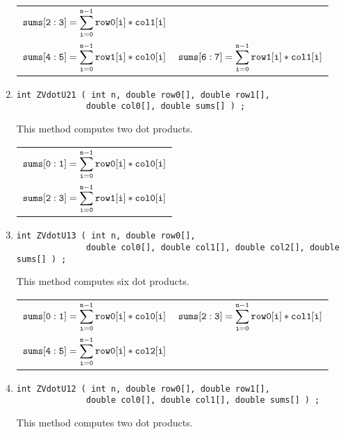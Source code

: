\begin{enumerate}
\begin{tabular}{ll}
$\displaystyle{\tt sums[2:3]}
               = \sum_{\tt i = 0}^{\tt n-1} {\tt row0[i] * col1[i]}$ \\
$\displaystyle{\tt sums[4:5]}
               = \sum_{\tt i = 0}^{\tt n-1} {\tt row1[i] * col0[i]}$ &
$\displaystyle{\tt sums[6:7]}
               = \sum_{\tt i = 0}^{\tt n-1} {\tt row1[i] * col1[i]}$ 
\end{tabular}
\item
\begin{verbatim}
int ZVdotU21 ( int n, double row0[], double row1[], 
              double col0[], double sums[] ) ;
\end{verbatim}
This method computes two dot products.
\par
\begin{tabular}{l}
$\displaystyle{\tt sums[0:1]}
               = \sum_{\tt i = 0}^{\tt n-1} {\tt row0[i] * col0[i]}$ \\
$\displaystyle{\tt sums[2:3]}
               = \sum_{\tt i = 0}^{\tt n-1} {\tt row1[i] * col0[i]}$ 
\end{tabular}
\item
\begin{verbatim}
int ZVdotU13 ( int n, double row0[], 
              double col0[], double col1[], double col2[], double sums[] ) ;
\end{verbatim}
This method computes six dot products.
\par
\begin{tabular}{ll}
$\displaystyle{\tt sums[0:1]}
               = \sum_{\tt i = 0}^{\tt n-1} {\tt row0[i] * col0[i]}$ &
$\displaystyle{\tt sums[2:3]}
               = \sum_{\tt i = 0}^{\tt n-1} {\tt row0[i] * col1[i]}$ \\
$\displaystyle{\tt sums[4:5]}
               = \sum_{\tt i = 0}^{\tt n-1} {\tt row0[i] * col2[i]}$ 
\end{tabular}
\item
\begin{verbatim}
int ZVdotU12 ( int n, double row0[], double row1[], 
              double col0[], double col1[], double sums[] ) ;
\end{verbatim}
This method computes two dot products.
\par
\begin{tabular}{ll}

\end{tabular}
\end{enumerate}
